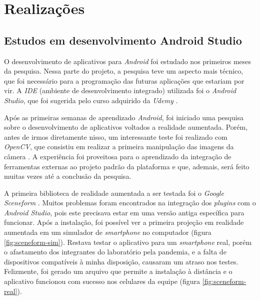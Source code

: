 \chapter{Realizações}\label{chp:realizacoes}

\section{Estudos em desenvolvimento Android Studio}

O desenvolvimento de aplicativos para \textit{Android} foi estudado nos primeiros meses da pesquisa. Nessa parte do projeto, a pesquisa teve um aspecto mais técnico, que foi necessário para a programação das futuras aplicações que estariam por vir. A \textit{IDE} (ambiente de desenvolvimento integrado) utilizada foi o \textit{Android Studio}, que foi sugerida pelo curso adquirido da \textit{Udemy} \cite{udemy}.

Após as primeiras semanas de aprendizado \textit{Android}, foi iniciado uma pesquisa sobre o desenvolvimento de aplicativos voltados a realidade aumentada. Porém, antes de irmos diretamente nisso, um interessante teste foi realizado com \textit{OpenCV},  que consistiu em realizar a primeira manipulação das imagens da câmera \cite{opencv}. A experiência foi proveitosa para o aprendizado da integração de ferramentas externas ao projeto padrão da plataforma e que, ademais, será feito muitas vezes até a conclusão da pesquisa.

A primeira biblioteca de realidade aumentada a ser testada foi o \textit{Google Sceneform} \cite{Sceneform}. Muitos problemas foram encontrados na integração dos \textit{plugins} com o \textit{Android Studio}, pois este precisava estar em uma versão antiga específica para funcionar. Após a instalação, foi possível ver a primeira projeção em realidade aumentada em um simulador de \textit{smartphone} no computador (figura \ref{fig:sceneform-sim}). Restava testar o aplicativo para um \textit{smartphone} real, porém o afastamento dos integrantes do laboratório pela pandemia, e a falta de dispositivos compatíveis à minha disposição, causaram um atraso nos testes. Felizmente, foi gerado um arquivo que permite a instalação à distância e o aplicativo funcionou com sucesso nos celulares da equipe (figura \ref{fig:sceneform-real}).

